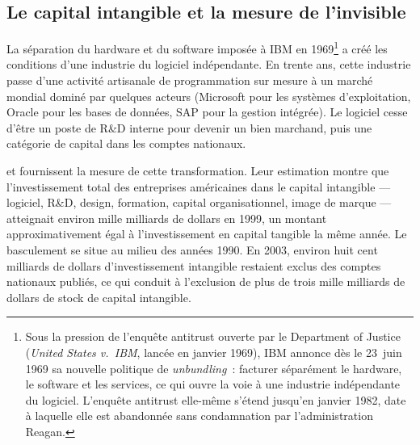 \subsection{Le capital intangible et la mesure de l'invisible}\label{subsec:logiciel}
 
La séparation du hardware et du software imposée à IBM en 1969\footnote{Sous la pression de l'enquête antitrust ouverte par le Department of Justice (\emph{United States v.~IBM}, lancée en janvier 1969), IBM annonce dès le 23~juin 1969 sa nouvelle politique de \emph{unbundling}~: facturer séparément le hardware, le software et les services, ce qui ouvre la voie à une industrie indépendante du logiciel. L'enquête antitrust elle-même s'étend jusqu'en janvier 1982, date à laquelle elle est abandonnée sans condamnation par l'administration Reagan.} a créé les conditions d'une industrie du logiciel indépendante. En trente ans, cette industrie passe d'une activité artisanale de programmation sur mesure à un marché mondial dominé par quelques acteurs (Microsoft pour les systèmes d'exploitation, Oracle pour les bases de données, SAP pour la gestion intégrée). Le logiciel cesse d'être un poste de R\&D interne pour devenir un bien marchand, puis une catégorie de capital dans les comptes nationaux.
 
\textcite{corrado_measuring_2005} et \textcite{corrado_intangible_2009} fournissent la mesure de cette transformation. Leur estimation montre que l'investissement total des entreprises américaines dans le capital intangible --- logiciel, R\&D, design, formation, capital organisationnel, image de marque --- atteignait environ mille milliards de dollars en 1999, un montant approximativement égal à l'investissement en capital tangible la même année. Le basculement se situe au milieu des années 1990. En 2003, environ huit cent milliards de dollars d'investissement intangible restaient exclus des comptes nationaux publiés, ce qui conduit à l'exclusion de plus de trois mille milliards de dollars de stock de capital intangible.

